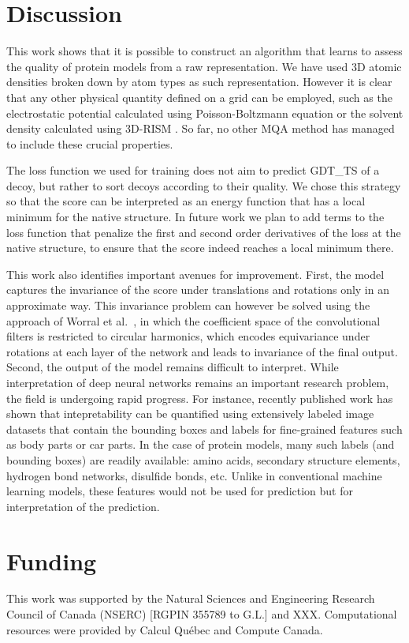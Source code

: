 \documentclass{bioinfo}
\begin{document}
\section{Discussion}

This work shows that it is possible to construct an algorithm that
learns to assess the quality of protein models from a raw
representation. We have used 3D atomic densities broken down by atom
types as such representation. However it is clear that any other
physical quantity defined on a grid can be employed, such as the
electrostatic potential calculated using Poisson-Boltzmann equation
\citep{honig95} or the solvent density calculated using 3D-RISM
\citep{stumpe2011}. So far, no other MQA method has managed
to include these crucial properties.

The loss function we used for training does not aim to predict GDT\_TS
of a decoy, but rather to sort decoys according to their quality. We
chose this strategy so that the score can be interpreted as an energy
function that has a local minimum for the native structure. In future
work we plan to add terms to the loss function that penalize the first
and second order derivatives of the loss at the native structure, to
ensure that the score indeed reaches a local minimum there.

This work also identifies important avenues for improvement. First,
the model captures the invariance of the score under translations and
rotations only in an approximate way. This invariance problem can
however be solved using the approach of Worral et
al.\ \citep{worrall2016harmonic}, in which the coefficient space of
the convolutional filters is restricted to circular harmonics, which
encodes equivariance under rotations at each layer of the network and
leads to invariance of the final output.
%
Second, the output of the model remains difficult to interpret. While
interpretation of deep neural networks remains an important research
problem, the field is undergoing rapid progress. For instance,
recently published work \citep{bau2017network} has shown that
intepretability can be quantified using extensively labeled image
datasets that contain the bounding boxes and labels for fine-grained
features such as body parts or car parts. In the case of protein
models, many such labels (and bounding boxes) are readily available:
amino acids, secondary structure elements, hydrogen bond networks,
disulfide bonds, etc. Unlike in conventional machine learning models,
these features would not be used for prediction but for interpretation
of the prediction.

\section*{Funding}
This work was supported by the Natural Sciences and Engineering Research
Council of Canada (NSERC) [RGPIN 355789 to G.L.] and XXX.
Computational resources were provided by Calcul Qu{\'e}bec and
Compute Canada.




\end{document}
